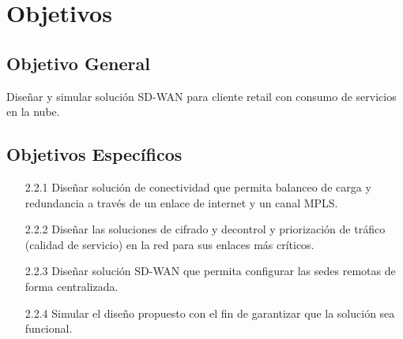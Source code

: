 \chapter{Objetivos}
\label{cha:Objetivos}

\section{Objetivo General} %
\label{sec:Objetivo General}


Diseñar y simular solución SD-WAN para cliente retail con consumo de servicios en
la nube.

\section{Objetivos Específicos} %
\label{sec:Objetivos Específicos}

\begin{itemize}
\item[2.2.1]Diseñar solución de conectividad que permita balanceo de carga y redundancia a través de un enlace de internet y un canal MPLS.
\item[2.2.2]Diseñar las soluciones de cifrado y decontrol y priorización de tráfico (calidad de servicio) en la red para sus enlaces más críticos.
\item[2.2.3]Diseñar solución SD-WAN que permita configurar las sedes remotas de forma centralizada.
\item[2.2.4]Simular el diseño propuesto con el fin de garantizar que la solución sea funcional.

\end{itemize}

